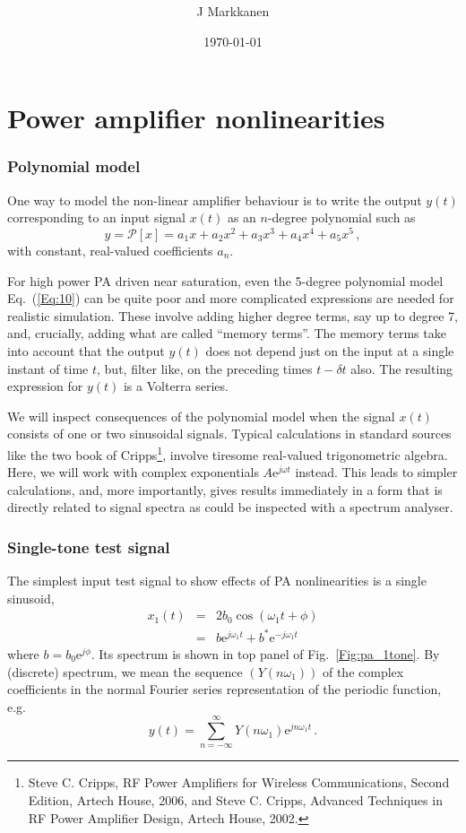 \documentclass[11pt,oneside,a4paper]{scrartcl}
\title{
\vspace{4cm}\BL{
PfP Array
}\\
\vspace{0.2cm}
\Large
}
\author{
J Markkanen\\
}
\date{\today}
\newcommand{\EQ}[1]{\begin{equation}\label{Eq:#1}}
\newcommand{\EE}{\end{equation}}
\newcommand{\Eq}[1]{Eq.~(\ref{Eq:#1})}
\newcommand{\Fig}[1]{Fig.~\ref{Fig:#1}}
\newcommand{\cc}[1]{\ensuremath{{#1}^*}}
\newcommand{ \Exp }[1] {\ensuremath {\mathrm e ^ {#1}}}
\newif\ifpdf
\begin{document}

\ifpdf
\DeclareGraphicsExtensions{.pdf, .jpg,.png}
\else
{}
\fi

\section*{Power amplifier nonlinearities}

\subsubsection*{Polynomial model}
One way to model the non-linear amplifier behaviour is to write the output $y(t)$ corresponding to an input signal $x(t)$ as an $n$-degree polynomial such as
\EQ{10}
	y = \mathcal{P}[x] = a_1 x + a_2 x^2 + a_3 x^3 + a_4 x^4 + a_5 x^5 \,,
\EE
with constant, real-valued coefficients $a_n$. 

For high power PA driven near saturation, even the 5-degree polynomial model \Eq{10} can be quite poor and more complicated expressions are needed for realistic simulation. These involve adding higher degree terms, say up to degree 7, and, crucially, adding what are called ``memory terms''. The memory terms take into account that the output $y(t)$ does not depend just on the input at a single instant of time $t$, but, filter like, on the preceding times $t-\delta t$ also. The resulting expression for $y(t)$ is a Volterra series. 

We will inspect consequences of the polynomial model when the signal $x(t)$ consists of one or two sinusoidal signals. Typical calculations in standard sources like the two book of Cripps\footnote{
Steve C. Cripps, RF Power Amplifiers for Wireless Communications, Second Edition, Artech House, 2006, and Steve C. Cripps, Advanced Techniques in RF Power Amplifier Design, Artech House, 2002. 
},
involve tiresome real-valued trigonometric algebra. Here, we will work with complex exponentials $A\Exp{ j\omega t}$ instead. This leads to simpler calculations, and, more importantly, gives results immediately in a form that is directly related to signal spectra as could be inspected with a spectrum analyser.

\subsubsection*{Single-tone test signal}
The simplest input test signal to show effects of PA nonlinearities is a single sinusoid,
\begin{eqnarray}
	x_1(t) &=& 2b_0 \cos( \omega_1 t + \phi) \label{Eq:A10} \\
			&=& b \Exp{j\omega_1 t} + \cc b \Exp{-j\omega_1 t} \label{Eq:A15}
\end{eqnarray}
where $b = b_0\Exp{j\phi}$. Its spectrum is shown in top panel of \Fig{pa_1tone}. By (discrete) spectrum, we mean the sequence $\left(Y(n\omega_1)\right)$ of the complex coefficients in the normal Fourier series representation of the periodic function, e.g.
\EQ{A18}
	y(t) = \sum_{n = -\infty}^\infty Y(n\omega_1) \Exp{j n \omega_1 t} \,.
\EE
 
\end{document}
